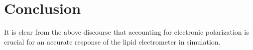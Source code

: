 \chapter*{Conclusion}

It is clear from the above discourse that accounting for electronic polarization is crucial for an accurate response of the lipid electrometer in simulation. 
